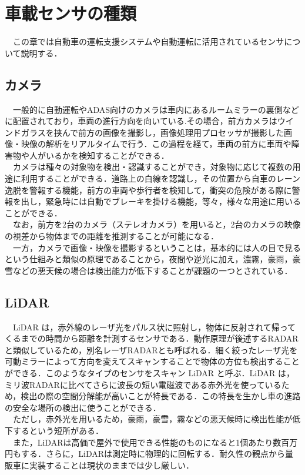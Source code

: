 \chapter{車載センサの種類}
　この章では自動車の運転支援システムや自動運転に活用されているセンサについて説明する．
\section{カメラ}
　一般的に自動運転やADAS向けのカメラは車内にあるルームミラーの裏側などに配置されており，車両の進行方向を向いている.その場合，前方カメラはウインドガラスを挟んで前方の画像を撮影し，画像処理用プロセッサが撮影した画像・映像の解析をリアルタイムで行う．この過程を経て，車両の前方に車両や障害物や人がいるかを検知することができる\cite{jidountenlab_sensor}．\\
　カメラは種々の対象物を検出・認識することができ，対象物に応じて複数の用途に利用することができる．道路上の白線を認識し，その位置から自車のレーン逸脱を警報する機能，前方の車両や歩行者を検知して，衝突の危険がある際に警報を出し，緊急時には自動でブレーキを掛ける機能，等々，様々な用途に用いることができる．\\
　なお，前方を2台のカメラ（ステレオカメラ）を用いると，2台のカメラの映像の視差から物体までの距離を推測することが可能になる\cite{denso_sensor}．\\
　一方，カメラで画像・映像を撮影するということは，基本的には人の目で見るという仕組みと類似の原理であることから，夜間や逆光に加え，濃霧，豪雨，豪雪などの悪天候の場合は検出能力が低下することが課題の一つとされている\cite{jidountenlab_sensor}．\\

\section{LiDAR}
　LiDAR は，赤外線のレーザ光をパルス状に照射し，物体に反射されて帰ってくるまでの時間から距離を計測するセンサである．動作原理が後述するRADARと類似しているため，別名レーザRADARとも呼ばれる．細く絞ったレーザ光を可動ミラーによって方向を変えてスキャンすることで物体の方位も検出することができる．このようなタイプのセンサをスキャン LiDAR と呼ぶ．LiDAR は，ミリ波RADARに比べてさらに波長の短い電磁波である赤外光を使っているため，検出の際の空間分解能が高いことが特長である．この特長を生かし車の進路の安全な場所の検出に使うことができる．\\
　ただし，赤外光を用いるため，豪雨，豪雪，霧などの悪天候時に検出性能が低下するという短所がある\cite{denso_sensor}．\\
　また，LiDARは高価で屋外で使用できる性能のものになると1個あたり数百万円もする．さらに，LiDARは測定時に物理的に回転する．耐久性の観点から量販車に実装することは現状のままでは少し厳しい\cite{MITTechnologyReview_sensor}．

